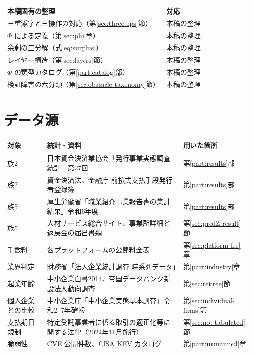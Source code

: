 \begin{center}
\begin{tabularx}{\textwidth}{@{}XX@{}}
\toprule
本稿固有の整理 & 対応 \\
\midrule
三重添字と三操作の対応（第\ref{sec:three-ops}節） & 本稿の整理 \\
$\Phi$ による定義（第\ref{sec:phi}章） & 本稿の整理 \\
余剰の三分解（式\eqref{eq:surplus}） & 本稿の整理 \\
レイヤー構造（第\ref{sec:layers}節） & 本稿の整理 \\
$\Phi$ の類型カタログ（第\ref{part:catalog}部） & 本稿の整理 \\
検証障害の六分類（第\ref{sec:obstacle-taxonomy}節） & 本稿の整理 \\
\bottomrule
\end{tabularx}
\label{tab:priorwork-layer3c}
\end{center}




\chapter{データ源}
\label{app:data}

\begin{center}
\begin{tabularx}{\textwidth}{@{}lXl@{}}
\toprule
対象 & 統計・資料 & 用いた箇所 \\
\midrule
族2 & 日本資金決済業協会「発行事業実態調査統計」第27回 \cite{jpsa2025} & 第\ref{part:results}部 \\
族2 & 資金決済法、金融庁 前払式支払手段発行者登録簿 & 第\ref{part:results}部 \\
族5 & 厚生労働省「職業紹介事業報告書の集計結果」令和6年度 \cite{mhlw2025} & 第\ref{part:results}部 \\
族5 & 人材サービス総合サイト、事業所詳細と返戻金の届出書類 & 第\ref{sec:predZ-result}節 \\
手数料 & 各プラットフォームの公開料金表 & 第\ref{sec:platform-fee}章 \\
業界判定 & 財務省「法人企業統計調査 時系列データ」\cite{mof2025} & 第\ref{part:industry}章 \\
起業年齢 & 中小企業白書2014、帝国データバンク新設法人動向調査 & 第\ref{sec:retiree}節 \\
個人企業との比較 & 中小企業庁「中小企業実態基本調査」令和2--7年確報 & 第\ref{sec:individual-firms}節 \\
支払期日規制 & 特定受託事業者に係る取引の適正化等に関する法律（2024年11月施行） & 第\ref{sec:not-tabulated}節 \\
脆弱性 & CVE 公開件数、CISA KEV カタログ & 第\ref{part:unmanned}章 \\
\bottomrule
\end{tabularx}
\label{tab:data-sources}
\end{center}

